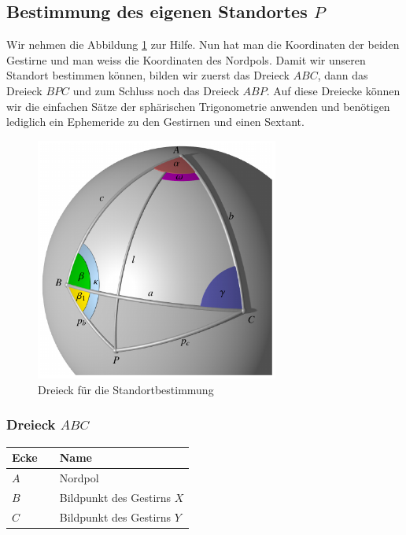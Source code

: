 \subsection{Bestimmung des eigenen Standortes $P$} \label{p}
Wir nehmen die Abbildung \ref{d2} zur Hilfe.
Nun hat man die Koordinaten der beiden Gestirne und man weiss die Koordinaten des Nordpols.
Damit wir unseren Standort bestimmen können, bilden wir zuerst das Dreieck $ABC$, dann das Dreieck $BPC$ und zum Schluss noch das Dreieck $ABP$.
Auf diese Dreiecke können wir die einfachen Sätze der sphärischen Trigonometrie anwenden und benötigen lediglich ein Ephemeride zu den Gestirnen und einen Sextant.

\begin{figure}
\centering
	\includegraphics[width=8cm]{papers/nav/bilder/dreieck.pdf}
	\caption[Dreieck für die Standortbestimmung]{Dreieck für die Standortbestimmung}
	\label{d2}
\end{figure}

\subsubsection{Dreieck $ABC$}

\begin{center}
	\begin{tabular}{ l l l }
		Ecke && Name  \\ 
		\hline
		$A$ && Nordpol \\  
		$B$ && Bildpunkt des Gestirns $X$ \\
		$C$&& Bildpunkt des Gestirns $Y$
	\end{tabular}
\end{center}

